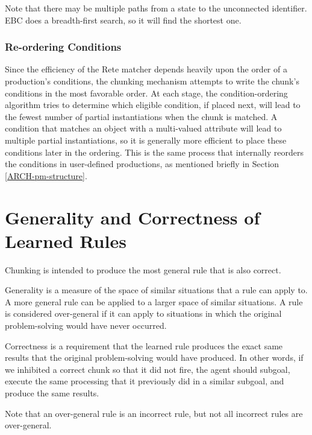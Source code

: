 Note that there may be multiple paths from a state to the unconnected identifier.  EBC does a breadth-first search, so it will find the shortest one.  

\subsubsection{Re-ordering Conditions}

Since the efficiency of the Rete matcher depends heavily upon the order of a production's conditions, the chunking mechanism attempts to write the chunk's conditions in the most favorable order. At each stage, the condition-ordering algorithm tries to determine which eligible condition, if placed next, will lead to the fewest number of partial instantiations when the chunk is matched. A condition that matches an object with a multi-valued attribute will lead to multiple partial instantiations, so it is generally more efficient to place these conditions later in the ordering.  This is the same process that internally reorders the conditions in user-defined productions, as mentioned briefly in Section \ref{ARCH-pm-structure}.


\section{Generality and Correctness of Learned Rules}
\label{CHUNKING-correctness}

Chunking is intended to produce the most general rule that is also correct. 

Generality is a measure of the space of similar situations that a rule can apply to.  A more general rule can be applied to a larger space of similar situations.  A rule is considered over-general if it can apply to situations in which the original problem-solving would have never occurred.  

Correctness is a requirement that the learned rule produces the exact same results that the original problem-solving would have produced.  In other words, if we inhibited a correct chunk so that it did not fire, the agent should subgoal, execute the same processing that it previously did in a similar subgoal, and produce the same results.

Note that an over-general rule is an incorrect rule, but not all incorrect rules are over-general.  


